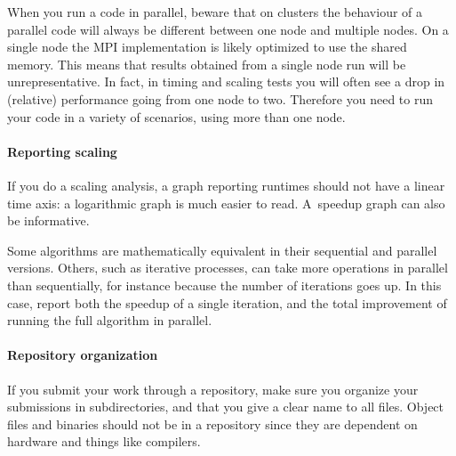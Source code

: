 When you run a code in parallel, beware that on clusters the behaviour
of a parallel code will always be different between one node and
multiple nodes.  On a single node the MPI implementation is likely
optimized to use the shared memory. This means that results obtained
from a single node run will be unrepresentative. In fact, in timing
and scaling tests you will often see a drop in (relative) performance
going from one node to two.  Therefore you need to run your code in a
variety of scenarios, using more than one node.

\paragraph*{Reporting scaling}

If you do a scaling analysis, a graph reporting runtimes should not
have a linear time axis: a logarithmic graph is much easier to
read. A~speedup graph can also be informative.

Some algorithms are mathematically equivalent in their sequential and
parallel versions. Others, such as iterative processes, can take more
operations in parallel than sequentially, for instance because the
number of iterations goes up. In this case, report both the speedup of
a single iteration, and the total improvement of running the full
algorithm in parallel.

\paragraph*{Repository organization}

If you submit your work through a repository, make sure you organize
your submissions in subdirectories, and that you give a clear name to
all files. Object files and binaries should not be in a repository
since they are dependent on hardware and things like compilers.

